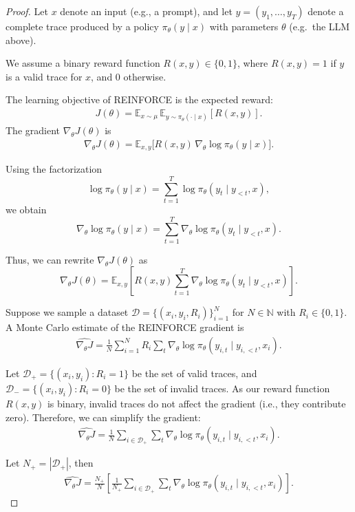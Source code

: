 \documentclass{article}
\begin{document}
\begin{proof}
Let $x$ denote an input (e.g., a prompt), and let $y = (y_1,\dots,y_T)$ denote a
complete trace produced by a policy $\pi_\theta(y \mid x)$ with parameters
$\theta$ (e.g.\ the LLM above).

We assume a binary reward function $R(x,y) \in \{0,1\}$, where $R(x,y) = 1$ if
$y$ is a valid trace for $x$, and 0 otherwise.

The learning objective of REINFORCE is the expected reward:
\begin{align*}
J(\theta) = \mathbb{E}_{x \sim \mu} \, \mathbb{E}_{y \sim \pi_\theta(\cdot\mid x)}[R(x,y)].
\end{align*}
The gradient $\nabla_\theta J(\theta)$ is
\begin{align*}
\nabla_\theta J(\theta)
= \mathbb{E}_{x,y}
\big[ R(x,y)\,\nabla_\theta \log \pi_\theta(y\mid x) \big].
\end{align*}

Using the factorization
\[
\log \pi_\theta(y\mid x)
= \sum_{t=1}^T \log \pi_\theta(y_t \mid y_{<t}, x),
\]
we obtain
\[
\nabla_\theta \log \pi_\theta(y\mid x)
= \sum_{t=1}^T
\nabla_\theta \log \pi_\theta(y_t \mid y_{<t}, x).
\]

Thus, we can rewrite $\nabla_\theta J(\theta)$ as
\[
\nabla_\theta J(\theta)
=
\mathbb{E}_{x,y}
\left[
R(x,y) \sum_{t=1}^T
\nabla_\theta
\log \pi_\theta(y_t \mid y_{<t}, x)
\right].
\]

Suppose we sample a dataset $\mathcal{D} = \{(x_i, y_i, R_i)\}_{i=1}^N$ for $N \in \mathbb{N}$ with $R_i \in \{0,1\}$.
A Monte Carlo estimate of the REINFORCE gradient is
\begin{align*}
\widehat{\nabla_\theta J} = \frac{1}{N} \sum_{i=1}^N R_i \sum_{t} \nabla_\theta \log \pi_\theta(y_{i,t} \mid y_{i,<t}, x_i).
\end{align*}

Let $\mathcal{D}_+ = \{(x_i,y_i) : R_i = 1\}$ be the set of valid traces, and $\mathcal{D}_- = \{(x_i,y_i) : R_i = 0\}$ be the set of invalid traces.
As our reward function $R(x,y)$ is binary, invalid traces do not affect the gradient (i.e., they contribute zero). Therefore, we can simplify the gradient:
\begin{align*}
\widehat{\nabla_\theta J} =
\frac{1}{N} \sum_{i \in \mathcal{D}_+}
\sum_t \nabla_\theta
\log \pi_\theta(y_{i,t} \mid y_{i,<t}, x_i).
\end{align*}

Let $N_+ = |\mathcal{D}_+|$, then
\begin{align}
\widehat{\nabla_\theta J}
=
\frac{N_+}{N}
\left[
\frac{1}{N_+}
\sum_{i \in \mathcal{D}_+}
\sum_t \nabla_\theta \log \pi_\theta(y_{i,t}\mid y_{i,<t},x_i)
\right].
\label{eq:gradient-reinforce}
\end{align}


\end{proof}
\end{document}
